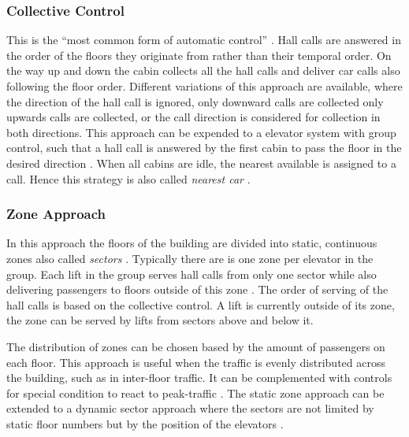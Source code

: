 \subsubsection{Collective Control}
This is the \enquote{most common form of automatic control} \autocite[][p.~237]{barney2016handbook}.
Hall calls are answered in the order of the floors they originate from rather than their temporal order.
On the way up and down the cabin collects all the hall calls and deliver car calls also following the floor order.
Different variations of this approach are available, where the direction of the hall call is ignored, only downward calls are collected only upwards calls are collected, or the call direction is considered for collection in both directions.
This approach can be expended to a elevator system with group control, such that a hall call is answered by the first cabin to pass the floor in the desired direction \autocite[][p.~238]{barney2016handbook}.
When all cabins are idle, the nearest available is assigned to a call. Hence this strategy is also called \emph{nearest car}
\autocite[][p.~244]{barney2016handbook}.

\subsubsection{Zone Approach}
In this approach the floors of the building are divided into static, continuous zones also called \emph{sectors} \autocite[][p.~247]{barney2016handbook}. 
Typically there are is one zone per elevator in the group. 
Each lift in the group serves hall calls from only one sector
while also delivering passengers to floors outside of this zone
\autocite[][pp.~3--6]{axelsson2013strategies}.
The order of serving of the hall calls is based on the collective control.
A lift is currently outside of its zone, 
the zone can be served by lifts from sectors above and below it.

The distribution of zones can be chosen based by the amount of passengers on each floor.
This approach is useful when the traffic is evenly distributed across the building, such as in inter-floor traffic. It can be complemented with controls for special condition to react to peak-traffic \autocite[][p.~247]{barney2016handbook}.
The static zone approach can be extended to a dynamic sector approach where the sectors are not limited by static floor numbers but by the position of the elevators \autocite[][p.~250]{barney2016handbook}.

